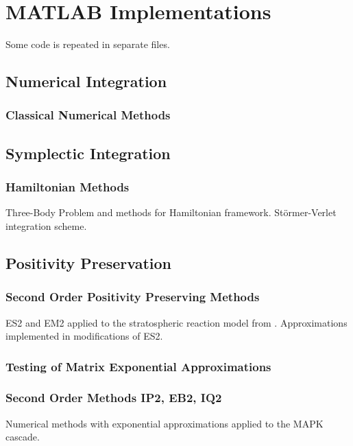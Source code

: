 \chapter{MATLAB Implementations}

Some code is repeated in separate files.

\section{Numerical Integration}

\subsection{Classical Numerical Methods}




\section{Symplectic Integration}

\subsection{Hamiltonian Methods}
\label{apn:ham}

Three-Body Problem and methods for Hamiltonian framework.
St\"ormer-Verlet integration scheme.




\section{Positivity Preservation}

\subsection{Second Order Positivity Preserving Methods}
\label{apn:es2}

ES2 and EM2 applied to the stratospheric reaction model from \cite{blanes_pos_2022}.
Approximations implemented in modifications of ES2.



\subsection{Testing of Matrix Exponential Approximations}
\label{apn:exp}




\subsection{Second Order Methods IP2, EB2, IQ2}
\label{apn:aprx}

Numerical methods with exponential approximations applied to the MAPK cascade.

